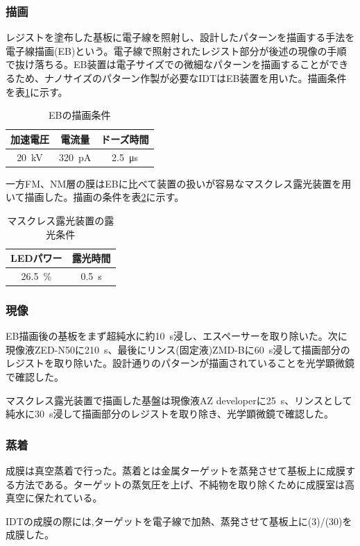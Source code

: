 \documentclass[dvipdfmx]{jsreport}
\numberwithin{equation}{chapter}
\numberwithin{table}{chapter}
\begin{document}
\subsubsection{描画}
レジストを塗布した基板に電子線を照射し、設計したパターンを描画する手法を電子線描画(EB)という。電子線で照射されたレジスト部分が後述の現像の手順で抜け落ちる。EB装置は電子サイズでの微細なパターンを描画することができるため、ナノサイズのパターン作製が必要なIDTはEB装置を用いた。描画条件を表\ref{tab:1}に示す。
\begin{table}[H]
	\centering
	\caption{EBの描画条件}
	\label{tab:1}
	\begin{tabular}{ccc} \hline \hline
		加速電圧&電流量&ドーズ時間\\ \hline
		\SI{20}{kV}&\SI{320}{\pico \ampere}&\SI{2.5}{\micro \second} \\ \hline \hline
	\end{tabular}
\end{table}
一方FM、NM層の膜はEBに比べて装置の扱いが容易なマスクレス露光装置を用いて描画した。描画の条件を表\ref{tab:2}に示す。
\begin{table}[H]
	\centering
	\caption{マスクレス露光装置の露光条件}
	\label{tab:2}
	\begin{tabular}{cc} \hline \hline
		LEDパワー&露光時間\\ \hline
		\SI{26.5}{\%}&\SI{0.5}{\second} \\ \hline \hline
	\end{tabular}
\end{table}
\subsubsection{現像}
EB描画後の基板をまず超純水に約\SI{10}{s}浸し、エスペーサーを取り除いた。次に現像液ZED-N50に\SI{210}{s}、最後にリンス(固定液)ZMD-Bに\SI{60}{s}浸して描画部分のレジストを取り除いた。設計通りのパターンが描画されていることを光学顕微鏡で確認した。

マスクレス露光装置で描画した基盤は現像液AZ developerに\SI{25}{s}、リンスとして純水に\SI{30}{s}浸して描画部分のレジストを取り除き、光学顕微鏡で確認した。
\subsubsection{蒸着}
成膜は真空蒸着で行った。蒸着とは金属ターゲットを蒸発させて基板上に成膜する方法である。ターゲットの蒸気圧を上げ、不純物を取り除くために成膜室は高真空に保たれている。

IDTの成膜の際には,ターゲットを電子線で加熱、蒸発させて基板上に(3)/(30)を成膜した。
\end{document}
